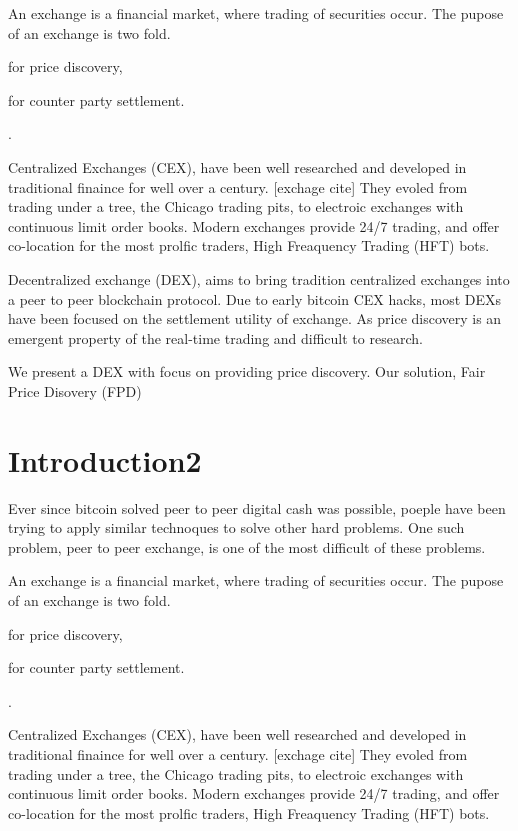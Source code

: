 \documentclass[12pt]{article}
\begin{document}
   

An exchange is a financial market, where trading of securities occur. The pupose of an exchange is two fold. \begin {enumerate*} [1) ]%
\item for price discovery, \item for counter party settlement. \end {enumerate*}. 

Centralized Exchanges (CEX), have been well researched and developed in traditional finaince for well over a century. [exchage cite] They  evoled from trading under a tree, the Chicago trading pits, to electroic exchanges with continuous limit order books. Modern exchanges provide 24/7 trading, and offer co-location for the most prolfic traders, High Freaquency Trading (HFT) bots. 

Decentralized exchange (DEX), aims to bring tradition centralized exchanges into a peer to peer blockchain protocol. Due to early bitcoin CEX hacks, most DEXs have been focused on the settlement utility of exchange. As price discovery is an emergent property of the real-time trading and difficult to research. 

We present a DEX with focus on providing price discovery. Our solution, Fair Price Disovery (FPD) 



\section{Introduction2}
Ever since bitcoin solved peer to peer digital cash was possible, poeple have been trying to apply similar technoques to solve other hard problems. One such problem, peer to peer exchange, is one of the most difficult of these problems. 

An exchange is a financial market, where trading of securities occur. The pupose of an exchange is two fold. \begin {enumerate*} [1) ]%
\item for price discovery, \item for counter party settlement. \end {enumerate*}. 

Centralized Exchanges (CEX), have been well researched and developed in traditional finaince for well over a century. [exchage cite] They  evoled from trading under a tree, the Chicago trading pits, to electroic exchanges with continuous limit order books. Modern exchanges provide 24/7 trading, and offer co-location for the most prolfic traders, High Freaquency Trading (HFT) bots. 
\end{document}
